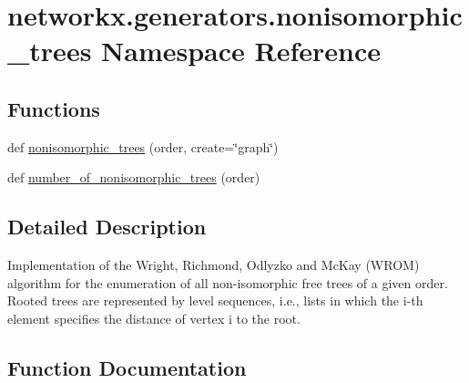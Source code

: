 \hypertarget{namespacenetworkx_1_1generators_1_1nonisomorphic__trees}{}\section{networkx.\+generators.\+nonisomorphic\+\_\+trees Namespace Reference}
\label{namespacenetworkx_1_1generators_1_1nonisomorphic__trees}
\subsection*{Functions}
\begin{DoxyCompactItemize}
\item 
def \hyperlink{namespacenetworkx_1_1generators_1_1nonisomorphic__trees_a7f79333ee805973a1d31506d9e0fd1dd}{nonisomorphic\+\_\+trees} (order, create=\char`\"{}graph\char`\"{})
\item 
def \hyperlink{namespacenetworkx_1_1generators_1_1nonisomorphic__trees_a66d9b154b22e025c5c680efc6273fee7}{number\+\_\+of\+\_\+nonisomorphic\+\_\+trees} (order)
\end{DoxyCompactItemize}


\subsection{Detailed Description}
\begin{DoxyVerb}Implementation of the Wright, Richmond, Odlyzko and McKay (WROM)
algorithm for the enumeration of all non-isomorphic free trees of a
given order.  Rooted trees are represented by level sequences, i.e.,
lists in which the i-th element specifies the distance of vertex i to
the root.\end{DoxyVerb}
 

\subsection{Function Documentation}
\mbox{\label{namespacenetworkx_1_1generators_1_1nonisomorphic__trees_a7f79333ee805973a1d31506d9e0fd1dd}} 

